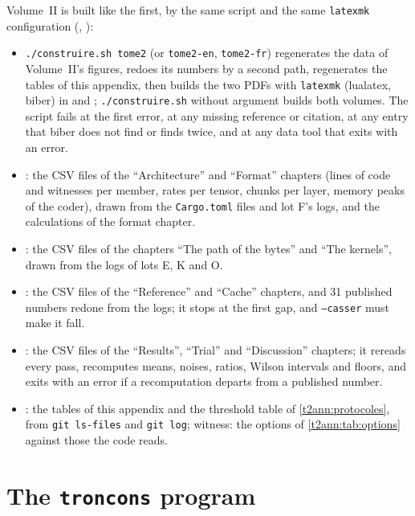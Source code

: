 Volume~II is built like the first, by the same script and the same \texttt{latexmk} configuration (, ):
\begin{itemize}
\item \texttt{./construire.sh tome2} (or \texttt{tome2-en}, \texttt{tome2-fr}) regenerates the data of Volume~II's figures, redoes its numbers by a second path, regenerates the tables of this appendix, then builds the two PDFs with \texttt{latexmk} (lualatex, biber) in  and ; \texttt{./construire.sh} without argument builds both volumes. The script fails at the first error, at any missing reference or citation, at any entry that biber does not find or finds twice, and at any data tool that exits with an error.
\item {}: the CSV files of the \enquote{Architecture} and \enquote{Format} chapters (lines of code and witnesses per member, rates per tensor, chunks per layer, memory peaks of the coder), drawn from the \texttt{Cargo.toml} files and lot F's logs, and the calculations of the format chapter.
\item {}: the CSV files of the chapters \enquote{The path of the bytes} and \enquote{The kernels}, drawn from the logs of lots E, K and O.
\item {}: the CSV files of the \enquote{Reference} and \enquote{Cache} chapters, and 31 published numbers redone from the logs; it stops at the first gap, and \texttt{--casser} must make it fall.
\item {}: the CSV files of the \enquote{Results}, \enquote{Trial} and \enquote{Discussion} chapters; it rereads every pass, recomputes means, noises, ratios, Wilson intervals and floors, and exits with an error if a recomputation departs from a published number.
\item {}: the tables of this appendix and the threshold table of \cref{t2ann:protocoles}, from \texttt{git ls-files} and \texttt{git log}; witness: the options of \cref{t2ann:tab:options} against those the code reads.
\end{itemize}

\section{The \texttt{troncons} program}\label{t2ann:sec:programme}

